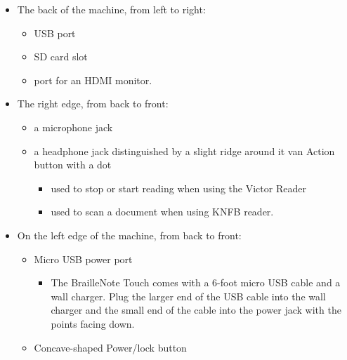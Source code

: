\documentclass[10pt,letterpaper,twoside]{report}
\begin{document}
{{{\begin{itemize}
\begin{itemize}
\begin{itemize}
		\item 	Triple tap of the Home button unloads or loads Keysoft.
		\end{itemize}
	\item 	Square context key
		\begin{itemize}
			\item Tapping the square context key opens a context menu for any program that is running. 
			If you hold the context key down for about two seconds, a list of all running applications appears so that you can switch to any open application. 
		\item 	The applications list also contains a Clear All button which can be used to free up memory.
		\end{itemize}
	\end{itemize}
	\item The back of the machine, from left to right: 
	\begin{itemize}
		\item USB port
		\item SD card slot
		\item port for an HDMI monitor.
	\end{itemize}
\item 	The right edge, from back to front:
	\begin{itemize}
		\item a microphone jack
		\item a headphone jack distinguished by a slight ridge around it
		van Action button with a dot
		\begin{itemize}
			\item used to stop or start reading when using the Victor Reader
		\item 	used to scan a document when using KNFB reader.
		\end{itemize}
	\end{itemize}
	\item On the left edge of the machine, from back to front: 
	\begin{itemize}
		\item Micro USB power port
		\begin{itemize}
		\item 	The BrailleNote Touch comes with a 6-foot micro USB cable and a wall charger. Plug the larger end of the USB cable into the wall charger and the small end of the cable into the power jack with the points facing down.
		\end{itemize}
		\item Concave-shaped Power/lock button

\end{itemize}
\end{itemize}}}}
\end{document}
